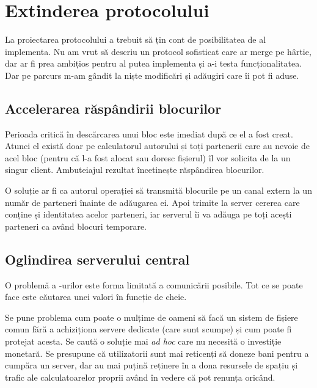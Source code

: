 \documentclass[a4wide,12pt]{report}
\newcommand{\acr}[1]{{\textsmaller[1]{\textsc{#1}}}} %
\begin{document}
\chapter{Extinderea protocolului}

La proiectarea protocolului a trebuit să țin cont de posibilitatea de al implementa. Nu am vrut să descriu un protocol
sofisticat care ar merge pe hârtie, dar ar fi prea ambițios pentru al putea implementa și a-i testa funcționalitatea.
Dar pe parcurs m-am gândit la niște modificări și adăugiri care îi pot fi aduse.

\section{Accelerarea răspândirii blocurilor} %

Perioada critică în descărcarea unui bloc este imediat după ce el a fost creat. Atunci el există doar pe calculatorul
autorului și toți partenerii care au nevoie de acel bloc (pentru că l-a fost alocat sau doresc fișierul) îl vor solicita
de la un singur client. Ambuteiajul rezultat încetinește răspândirea blocurilor.

O soluție ar fi ca autorul operației să transmită blocurile pe un canal extern la un număr de parteneri înainte de
adăugarea ei. Apoi trimite la server cererea care conține și identitatea acelor parteneri, iar serverul îi va adăuga pe
toți acești parteneri ca având blocuri temporare.

\section{Oglindirea serverului central} %

O problemă a \acr{TDD}-urilor este forma limitată a comunicării posibile. Tot ce se poate face este căutarea unei valori
în funcție de cheie.

Se pune problema cum poate o mulțime de oameni să facă un sistem de fișiere comun fără a achiziționa servere dedicate
(care sunt scumpe) și cum poate fi protejat acesta. Se caută o soluție mai \emph{ad hoc} care nu necesită o investiție
monetară.  Se presupune că utilizatorii sunt mai reticenți să doneze bani pentru a cumpăra un server, dar au mai puțină
reținere în a dona resursele de spațiu și trafic ale calculatoarelor proprii având în vedere că pot renunța oricând.
\end{document}
